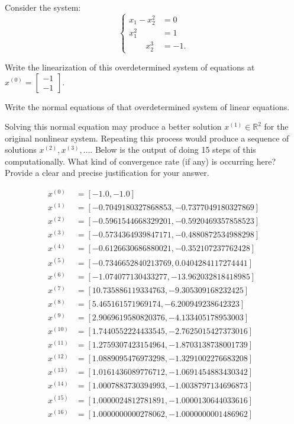 \documentclass[11pt]{article}
\newenvironment{problem}[2][Question]{\begin{trivlist}
\item[\hskip \labelsep {\bfseries #1}\hskip \labelsep {\bfseries #2.}]}{\end{trivlist}}
\theoremstyle{definition}
\begin{document}
\begin{problem}{Q2}
Consider the system:
$$ \begin{cases} 
x_1 - x_2^2 &= 0\\
x^2_1 \qquad & = 1\\
\qquad x^3_2 & = -1.
\end{cases}$$
    \item[(a)] Write the linearization of this overdetermined system of equations at $x^{(0)} = \begin{bmatrix} -1 \\ -1\end{bmatrix}$.

    \vskip0.5cm


    \item[(b)] Write the normal equations of that overdetermined system of linear equations.

    \vskip0.5cm


    \item[(c)] Solving this normal equation may produce a better solution $x^{(1)}\in\mathbb{R}^2$ for the original nonlinear system. Repeating this process would produce a sequence of solutions $x^{(2)},x^{(3)},\dots$. Below is the output of doing 15 steps of this computationally. What kind of convergence rate (if any) is occurring here? Provide a clear and precise justification for your answer.
    
    \footnotesize
    \begin{align*}
        x^{(0)} &= [-1.0, -1.0]\\
        x^{(1)} &= [-0.7049180327868853, -0.7377049180327869]\\
        x^{(2)} &= [-0.5961544668329201, -0.5920469357858523]\\
        x^{(3)} &= [-0.5734364939847171, -0.4880872534988298]\\
        x^{(4)} &= [-0.6126630686880021, -0.352107237762428]\\
        x^{(5)} &= [-0.7346652840213769, 0.0404284117274441]\\
        x^{(6)} &= [-1.074077130433277, -13.962032818418985]\\
        x^{(7)} &= [10.735886119334763, -9.305309168232425]\\
        x^{(8)} &= [5.465161571969174, -6.200949238642323]\\
        x^{(9)} &= [2.9069619580820376, -4.133405178953003]\\
        x^{(10)} &= [1.7440552224433545, -2.7625015427373016]\\
        x^{(11)} &= [1.2759307423154964, -1.8703138738001739]\\
        x^{(12)} &= [1.0889095476973298, -1.3291002276683208]\\
        x^{(13)} &= [1.0161436089776712, -1.0691454883430342]\\
        x^{(14)} &= [1.0007883730394993, -1.0038797134696873]\\
        x^{(15)} &= [1.0000024812781891, -1.0000130644033616]\\
        x^{(16)} &= [1.0000000000278062, -1.0000000001486962]
    \end{align*}
\end{problem}
\end{document}
